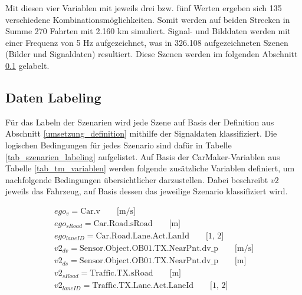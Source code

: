 Mit diesen vier Variablen mit jeweils drei bzw. fünf Werten ergeben sich 135 verschiedene Kombinationsmöglichkeiten. Somit werden auf beiden Strecken in Summe 270 Fahrten mit 2.160 km simuliert. Signal- und Bilddaten werden mit einer Frequenz von 5 Hz aufgezeichnet, was in 326.108 aufgezeichneten Szenen (Bilder und Signaldaten) resultiert. Diese Szenen werden im folgenden Abschnitt \ref{umsetzung_daten_synth_labeling} gelabelt.


\subsection{Daten Labeling}
\label{umsetzung_daten_synth_labeling}

Für das Labeln der Szenarien wird jede Szene auf Basis der Definition aus Abschnitt \ref{umsetzung_definition} mithilfe der Signaldaten klassifiziert. Die logischen Bedingungen für jedes Szenario sind dafür in Tabelle \ref{tab_szenarien_labeling} aufgelistet. Auf Basis der CarMaker-Variablen aus Tabelle \ref{tab_tm_variablen} werden folgende zusätzliche Variablen definiert, um nachfolgende Bedingungen übersichtlicher darzustellen. Dabei beschreibt $v2$ jeweils das Fahrzeug, auf Basis dessen das jeweilige Szenario klassifiziert wird.

\begin{equation*}
\begin{split}
ego_v = \text{Car.v} \qquad \text{[m/s]} \\
ego_{sRoad} = \text{Car.Road.sRoad} \qquad \text{[m]} \\
ego_{laneID} = \text{Car.Road.Lane.Act.LanId} \qquad \text{[1, 2]} \\
v2_{dv} = \text{Sensor.Object.OB01.TX.NearPnt.dv\_p} \qquad \text{[m/s]} \\
v2_{ds} = \text{Sensor.Object.OB01.TX.NearPnt.dv\_p} \qquad \text{[m]} \\
v2_{sRoad} = \text{Traffic.TX.sRoad} \qquad \text{[m]} \\
v2_{laneID} = \text{Traffic.TX.Lane.Act.LaneId} \qquad \text{[1, 2]} \\
\end{split}
\end{equation*}


